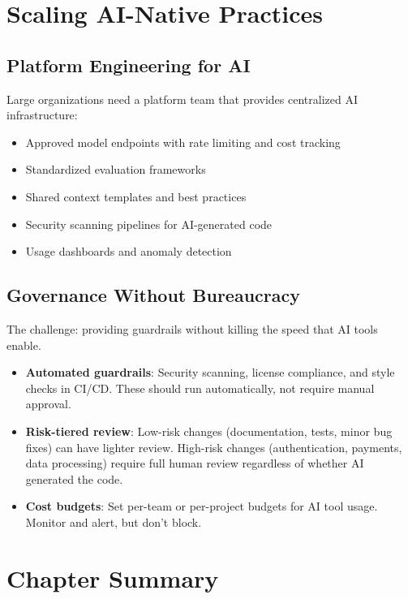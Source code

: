 \section{Scaling AI-Native Practices}

\subsection{Platform Engineering for AI}

Large organizations need a platform team that provides centralized AI infrastructure:

\begin{itemize}[leftmargin=*]
    \item Approved model endpoints with rate limiting and cost tracking
    \item Standardized evaluation frameworks
    \item Shared context templates and best practices
    \item Security scanning pipelines for AI-generated code
    \item Usage dashboards and anomaly detection
\end{itemize}

\subsection{Governance Without Bureaucracy}

The challenge: providing guardrails without killing the speed that AI tools enable.

\begin{itemize}[leftmargin=*]
    \item \textbf{Automated guardrails}: Security scanning, license compliance, and style checks in CI/CD. These should run automatically, not require manual approval.
    \item \textbf{Risk-tiered review}: Low-risk changes (documentation, tests, minor bug fixes) can have lighter review. High-risk changes (authentication, payments, data processing) require full human review regardless of whether AI generated the code.
    \item \textbf{Cost budgets}: Set per-team or per-project budgets for AI tool usage. Monitor and alert, but don't block.
\end{itemize}


\section{Chapter Summary}

